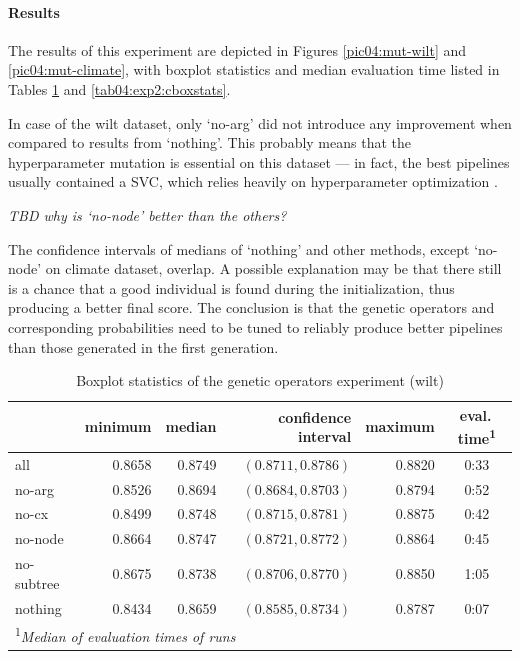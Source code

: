 \paragraph{Results}
The results of this experiment are depicted in Figures \ref{pic04:mut-wilt} and
\ref{pic04:mut-climate}, with boxplot statistics and median evaluation time
listed in Tables \ref{tab04:exp2:wboxstats} and \ref{tab04:exp2:cboxstats}.

In case of the wilt dataset, only `no-arg' did not introduce any improvement
when compared to results from `nothing'. This probably means that the
hyperparameter mutation is essential on this dataset --- in fact, the best
pipelines usually contained a SVC, which relies heavily on hyperparameter
optimization \citep{Feurer:2015:ERA:2969442.2969547}.

\textit{TBD why is `no-node' better than the others?}

The confidence intervals of medians of `nothing' and other methods, except
`no-node' on climate dataset, overlap. A possible explanation may be that
there still is a chance that a good individual is found during the
initialization, thus producing a better final score. The conclusion is that the
genetic operators and corresponding probabilities need to be tuned to reliably
produce better pipelines than those generated in the first generation.

\begin{table}[ht]
\centering
\caption{Boxplot statistics of the genetic operators experiment (wilt)}\label{tab04:exp2:wboxstats}
\begin{tabular}{lrrrr|c}
\toprule
{} &  minimum &  median &  confidence interval &  maximum & eval.\,time\textsuperscript{1} \\
\midrule
all        &   0.8658 &  0.8749 &   $(0.8711,0.8786)$ &   0.8820 & 0:33 \\
no-arg     &   0.8526 &  0.8694 &   $(0.8684,0.8703)$ &   0.8794 & 0:52 \\
no-cx      &   0.8499 &  0.8748 &   $(0.8715,0.8781)$ &   0.8875 & 0:42 \\
no-node    &   0.8664 &  0.8747 &   $(0.8721,0.8772)$ &   0.8864 & 0:45 \\
no-subtree &   0.8675 &  0.8738 &   $(0.8706,0.8770)$ &   0.8850 & 1:05 \\
nothing    &   0.8434 &  0.8659 &   $(0.8585,0.8734)$ &   0.8787 & 0:07 \\
\bottomrule

\multicolumn{6}{l}{\footnotesize\textsuperscript{1}\itshape Median of evaluation times of runs}

\end{tabular}

\end{table}

